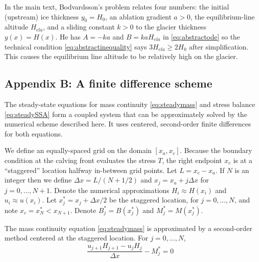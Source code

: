 \documentclass[review,letterpaper]{igs}
\begin{document}
In the main text, Bodvardsson's problem relates four numbers: the initial (upstream) ice thickness $y_0=H_0$, an ablation gradient $a>0$, the equilibrium-line altitude $H_{ela}$, and a sliding constant $k>0$ to the glacier thickness $y(x) = H(x)$.  He has $A=-ka$ and $B=k a H_{ela}$ in \eqref{eq:abstractode} so the technical condition \eqref{eq:abstractinequality} says $3 H_{ela} \ge 2 H_0$ after simplification.  This causes the equilibrium line altitude to be relatively high on the glacier.


\subsection{Appendix B: A finite difference scheme}  The steady-state equations for mass continuity \eqref{eq:steadymass} and stress balance \eqref{eq:steadySSA} form a coupled system that can be approximately solved by the numerical scheme described here.  It uses centered, second-order finite differences for both equations.

We define an equally-spaced grid on the domain $[x_a,x_c]$.  Because the boundary condition at the calving front evaluates the stress $T$, the right endpoint $x_c$ is at a ``staggered'' location halfway in-between grid points.  Let $L=x_c-x_a$.  If $N$ is an integer then we define $\Delta x = L / (N+1/2)$ and $x_j = x_a + j\Delta x$ for $j=0,\dots,N+1$.  Denote the numerical approximations $H_i\approx H(x_i)$ and $u_i \approx u(x_i)$.  Let $x_j^* = x_j + \Delta x/2$ be the staggered location, for $j=0,\dots,N$, and note $x_c = x_N^* < x_{N+1}$.  Denote $B_j^*=B(x_j^*)$ and $M_j^*=M(x_j^*)$.

The mass continuity equation \eqref{eq:steadymass} is approximated by a second-order method centered at the staggered location.  For $j=0,\dots,N$,
\begin{equation}
\frac{u_{j+1} H_{j+1} - u_j H_j}{\Delta x} - M_j^* = 0 \label{eq:steadymassFD}
\end{equation}
\end{document}
